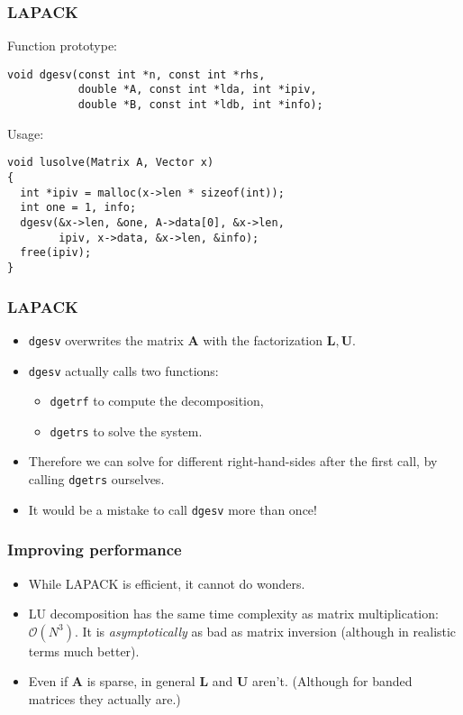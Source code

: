 \begin{frame}[fragile]
  \frametitle{LAPACK}
  Function prototype:
  \begin{lstlisting}[style=c]
void dgesv(const int *n, const int *rhs,
           double *A, const int *lda, int *ipiv,
           double *B, const int *ldb, int *info);
  \end{lstlisting}
  Usage:
  \begin{lstlisting}[style=c]
void lusolve(Matrix A, Vector x)
{
  int *ipiv = malloc(x->len * sizeof(int));
  int one = 1, info;
  dgesv(&x->len, &one, A->data[0], &x->len,
        ipiv, x->data, &x->len, &info);
  free(ipiv);
}
  \end{lstlisting}
\end{frame}

\begin{frame}
  \frametitle{LAPACK}
  \begin{itemize}
  \item \texttt{dgesv} overwrites the matrix $\bm A$ with the factorization
    $\bm L, \bm U$.
  \item \texttt{dgesv} actually calls two functions:
    \begin{itemize}
    \item \texttt{dgetrf} to compute the decomposition,
    \item \texttt{dgetrs} to solve the system.
    \end{itemize}
  \item Therefore we can solve for different right-hand-sides after the first
    call, by calling \texttt{dgetrs} ourselves.
  \item It would be a mistake to call \texttt{dgesv} more than once!
  \end{itemize}
\end{frame}

\begin{frame}
  \frametitle{Improving performance}
  \begin{itemize}
  \item While LAPACK is efficient, it cannot do wonders.
  \item LU decomposition has the same time complexity as matrix multiplication:
    $\mathcal{O}(N^3)$. It is \emph{asymptotically} as bad as matrix inversion
    (although in realistic terms much better).
  \item Even if $\bm A$ is sparse, in general $\bm L$ and $\bm U$ aren't.
    (Although for banded matrices they actually are.)
  \end{itemize}
\end{frame}


